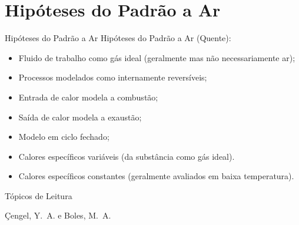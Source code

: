 \section{Hipóteses do Padrão a Ar}

    \begin{frame}{Hipóteses do Padrão a Ar}\vspace*{-1em}
        Hipóteses do Padrão a Ar (Quente):

        \begin{itemize}
            \item<1->  Fluido de trabalho como \alert{gás ideal} (geralmente mas não
                necessariamente \alert{ar});
            \item<2->  Processos modelados como \alert{internamente reversíveis};
            \item<3->  Entrada de \alert{calor} modela a combustão;
            \item<4->  Saída de \alert{calor} modela a exaustão;
            \item<5->  Modelo em \alert{ciclo fechado};
            \item<6->  Calores específicos \alert{variáveis} (da substância como gás ideal).
        \end{itemize}
        \vspace*\medskipamount

        
        \begin{itemize}
            \item<7->  Calores específicos \alert{constantes} (geralmente avaliados em
                \alert{baixa temperatura}).
        \end{itemize}
    \end{frame}

    \begin{frame}[allowframebreaks]{Tópicos de Leitura}
        \begin{thebibliography}{Çengel, Y.~A., 2013}
                Çengel, Y.~A. e Boles, M.~A.
        \end{thebibliography}
    \end{frame}




